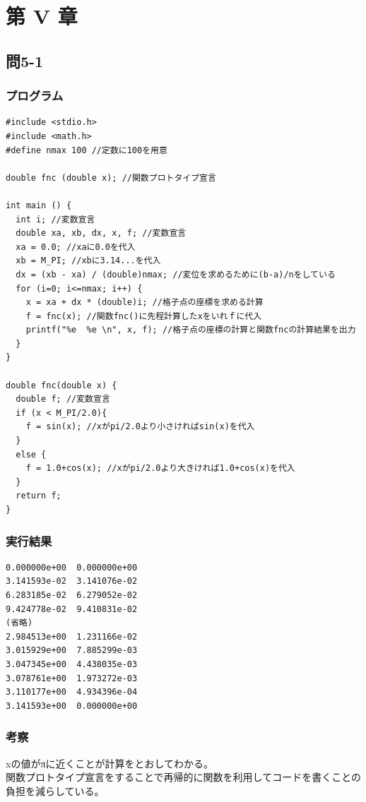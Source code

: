 \documentclass{jarticle}
\begin{document}
\section{第 V 章\\}
\subsection{問5-1\\}
\subsubsection{プログラム\\}
\begin{breakbox}
\begin{verbatim}
#include <stdio.h>
#include <math.h>
#define nmax 100 //定数に100を用意

double fnc (double x); //関数プロトタイプ宣言

int main () {
  int i; //変数宣言
  double xa, xb, dx, x, f; //変数宣言
  xa = 0.0; //xaに0.0を代入
  xb = M_PI; //xbに3.14...を代入
  dx = (xb - xa) / (double)nmax; //変位を求めるために(b-a)/nをしている
  for (i=0; i<=nmax; i++) {
    x = xa + dx * (double)i; //格子点の座標を求める計算
    f = fnc(x); //関数fnc()に先程計算したxをいれｆに代入
    printf("%e  %e \n", x, f); //格子点の座標の計算と関数fncの計算結果を出力
  }
}

double fnc(double x) {
  double f; //変数宣言
  if (x < M_PI/2.0){
    f = sin(x); //xがpi/2.0より小さければsin(x)を代入
  }
  else {
    f = 1.0+cos(x); //xがpi/2.0より大きければ1.0+cos(x)を代入
  }
  return f;
}
\end{verbatim}
\end{breakbox}
\subsubsection{実行結果\\}
\begin{breakbox}
\begin{verbatim}
0.000000e+00  0.000000e+00 
3.141593e-02  3.141076e-02 
6.283185e-02  6.279052e-02 
9.424778e-02  9.410831e-02 
(省略)
2.984513e+00  1.231166e-02 
3.015929e+00  7.885299e-03 
3.047345e+00  4.438035e-03 
3.078761e+00  1.973272e-03 
3.110177e+00  4.934396e-04 
3.141593e+00  0.000000e+00 
\end{verbatim}
\end{breakbox}
\subsubsection{考察\\}
xの値がπに近くことが計算をとおしてわかる。\\
関数プロトタイプ宣言をすることで再帰的に関数を利用してコードを書くことの負担を減らしている。\\
\end{document}
